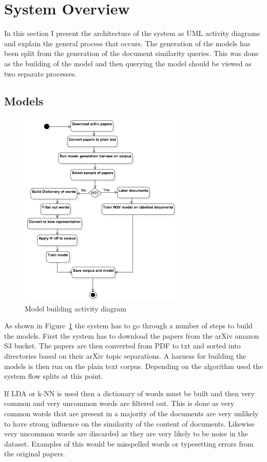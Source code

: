 \section{System Overview}
In this section I present the architecture of the system as UML activity diagrams and explain the general process that occurs.
The generation of the models has been split from the generation of the document similarity queries.
This was done as the building of the model and then querying the model should be viewed as two separate processes.

\subsection{Models}
\begin{figure}[h]
    \centering
        \includegraphics[width=0.7\textwidth]{Figures/ArchictectureBuildingUML.png}
    \caption{Model building activity diagram}
    \label{fig:buildUML}
\end{figure}
As shown in Figure~\ref{fig:buildUML} the system has to go through a number of steps to build the models.
First the system has to download the papers from the arXiv amazon S3 bucket.
The papers are then converted from PDF to txt and sorted into directories based on their arXiv topic separations.
A harness for building the models is then run on the plain text corpus.
Depending on the algorithm used the system flow splits at this point.

If LDA or k-NN is used then a dictionary of words must be built and then very common and very uncommon words are filtered out.
This is done as very common words that are present in a majority of the documents are very unlikely to have strong influence on the similarity of the content of documents.
Likewise very uncommon words are discarded as they are very likely to be noise in the dataset.
Examples of this would be misspelled words or typesetting errors from the original papers.

